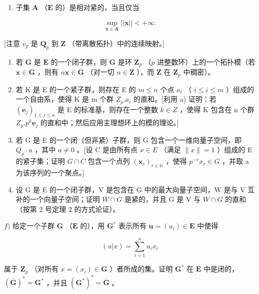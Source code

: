 \begin{enumerate}
\def\labelenumi{\alph{enumi})}
\tightlist
\item
  子集 \(\mathbf{A}\) （\(\mathbf{E}\) 的）是相对紧的，当且仅当
\end{enumerate}

\[
\sup _ {\mathbf {x} \in \mathbf {A}} | | \mathbf {x} | | <   + \infty .
\]

{[}注意 \(v_{p}\) 是 \(\mathbf{Q}_p\) 到 \(\mathbf{Z}\) （带离散拓扑）中的连续映射。{]}

\begin{enumerate}
\def\labelenumi{\alph{enumi})}
\setcounter{enumi}{1}
\item
  若 \(\mathbf{G}\) 是 \(\mathbf{E}\) 的一个闭子群，则 \(\mathbf{G}\) 是环 \(\mathbf{Z}_p\) （\(p\) 进整数环）上的一个拓扑模（若 \(\boldsymbol{x} \in \mathbf{G}\) ，则有 \(n\boldsymbol{x} \in \mathbf{G}\) （对一切 \(n \in \mathbf{Z}\) ），而 \(\mathbf{Z}\) 在 \(\mathbf{Z}_p\) 中稠密）。
\item
  若 K 是 E 的一个紧子群，则存在 E 的 \(m \leqslant n\) 个点 \(a_{i}\) （ \(i \leqslant i \leqslant m\) ）组成的一个自由系，使得 K 是 m 个群 \(Z_{p}.a_{i}\) 的直和。{[}利用 a) 证明：若 \((\boldsymbol{e}_{j})_{1 \leqslant j \leqslant n}\) 是 E 的标准基，则存在一个整数 \(k \in Z\) ，使得 K 包含在 n 个群 \(Z_{p}.p^{k}\boldsymbol{e}_{j}\) 的直和中；然后应用主理想环上的模的理论。{]}
\item
  若 G 是 E 的一个闭（但非紧）子群，则 G 包含一个一维向量子空间，即 \(Q_{p} \cdot a\) ，其中 \(a \neq 0\) 。{[}设 C 是由所有点 \(x \in E\) （满足 \(\|x\| = 1\) ）组成的 E 的紧子集；证明 \(G \cap C\) 包含一个点列 \((\boldsymbol{x}_{r})_{r \in \mathbb{N}}\) ，使得 \(p^{-r}x_{r} \in G\) ，并取 a 为该序列的一个聚点。{]}
\item
  设 G 是 E 的一个闭子群，V 是包含在 G 中的最大向量子空间，W 是与 V 互补的一个向量子空间；证明 \(W \cap G\) 是紧的，并且 G 是 V 与 \(W \cap G\) 的直和（按第 2 号定理 2 的方式论证）。
\end{enumerate}

\(f)\) 给定一个子群 \(\mathbf{G}\) （\(\mathbf{E}\) 的），用 \(\mathbf{G}^*\) 表示所有 \(\boldsymbol{u} = (u_i) \in \mathbf{E}\) 中使得

\[
(u | x) = \sum_ {i = 1} ^ {n} u _ {i} x _ {i}
\]

属于 \(\mathbf{Z}_p\) （对所有 \(x = (x_i) \in \mathbf{G}\) ）者所成的集。证明 \(\mathbf{G}^*\) 在 \(\mathbf{E}\) 中是闭的，\((\overline{\mathbf{G}})^* = \mathbf{G}^*\) ，并且 \((\mathbf{G}^*)^* = \overline{\mathbf{G}}\) 。


